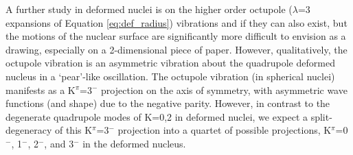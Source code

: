A further study in deformed nuclei is on the higher order octupole ($\lambda$=3 expansions of Equation \ref{eq:def_radius}) vibrations and if they can also exist, but the motions of the nuclear surface are significantly more difficult to envision as a drawing, especially on a 2-dimensional piece of paper. However, qualitatively, the octupole vibration is an asymmetric vibration about the quadrupole deformed nucleus in a `pear'-like oscillation. The octupole vibration (in spherical nuclei) manifests as a K$^\pi$=3$^-$ projection on the axis of symmetry, with asymmetric wave functions (and shape) due to the negative parity. However, in contrast to the degenerate quadrupole modes of K=0,2 in deformed nuclei, we expect a split-degeneracy of this K$^\pi$=3$^-$ projection into a quartet of possible projections, K$^\pi$=0$^-$, 1$^-$, 2$^-$, and 3$^-$ \cite{BohrMott_text} in the deformed nucleus.


